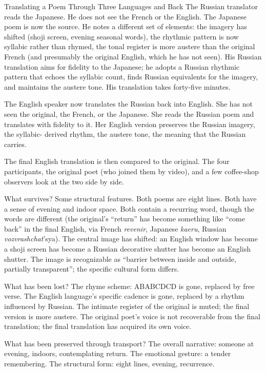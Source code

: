\begin{coda}{Translating a Poem Through Three Languages and Back}
The Russian translator reads the Japanese. He does not see the
French or the English. The Japanese poem is now the source. He
notes a different set of elements: the imagery has shifted (shoji
screen, evening seasonal words), the rhythmic pattern is now
syllabic rather than rhymed, the tonal register is more austere
than the original French (and presumably the original English,
which he has not seen). His Russian translation aims for fidelity
to the Japanese; he adopts a Russian rhythmic pattern that
echoes the syllabic count, finds Russian equivalents for the
imagery, and maintains the austere tone. His translation takes
forty-five minutes.

The English speaker now translates the Russian back into English.
She has not seen the original, the French, or the Japanese. She
reads the Russian poem and translates with fidelity to it. Her
English version preserves the Russian imagery, the syllabic-
derived rhythm, the austere tone, the meaning that the Russian
carries.

The final English translation is then compared to the original.
The four participants, the original poet (who joined them by
video), and a few coffee-shop observers look at the two side by
side.

What survives? Some structural features. Both poems are eight
lines. Both have a sense of evening and indoor space. Both
contain a recurring word, though the words are different (the
original's ``return'' has become something like ``come back'' in
the final English, via French \emph{revenir}, Japanese
\emph{kaeru}, Russian \emph{vozvrashchat}'sya). The central
image has shifted: an English window has become a shoji screen
has become a Russian decorative shutter has become an English
shutter. The image is recognizable as ``barrier between inside
and outside, partially transparent''; the specific cultural
form differs.

What has been lost? The rhyme scheme: ABABCDCD is gone, replaced
by free verse. The English language's specific cadence is gone,
replaced by a rhythm influenced by Russian. The intimate
register of the original is muted; the final version is more
austere. The original poet's voice is not recoverable from the
final translation; the final translation has acquired its own
voice.

What has been preserved through transport? The overall
narrative: someone at evening, indoors, contemplating return.
The emotional gesture: a tender remembering. The structural
form: eight lines, evening, recurrence.


\end{coda}
